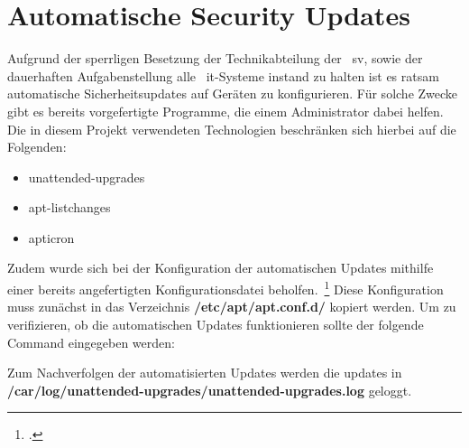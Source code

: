 
\section{Automatische Security Updates}\label{sec:automatische-security-updates}
Aufgrund der sperrligen Besetzung der Technikabteilung der ~\gls{sv}, sowie der dauerhaften Aufgabenstellung alle ~\gls{it}-Systeme instand zu halten ist es ratsam automatische
Sicherheitsupdates auf Geräten zu konfigurieren.
Für solche Zwecke gibt es bereits vorgefertigte Programme, die einem Administrator dabei helfen. \\
Die in diesem Projekt verwendeten Technologien beschränken sich hierbei auf die Folgenden:
\begin{itemize}
    \item unattended-upgrades
    \item apt-listchanges
    \item apticron
\end{itemize}


\linebreak
Zudem wurde sich bei der Konfiguration der automatischen Updates mithilfe einer bereits angefertigten Konfigurationsdatei beholfen.~\footcite{auto-update-config}
Diese Konfiguration muss zunächst in das Verzeichnis \textbf{/etc/apt/apt.conf.d/} kopiert werden.
Um zu verifizieren, ob die automatischen Updates funktionieren sollte der folgende Command eingegeben werden:

\linebreak
Zum Nachverfolgen der automatisierten Updates werden die updates in \textbf{/car/log/unattended-upgrades/unattended-upgrades.log} geloggt.
